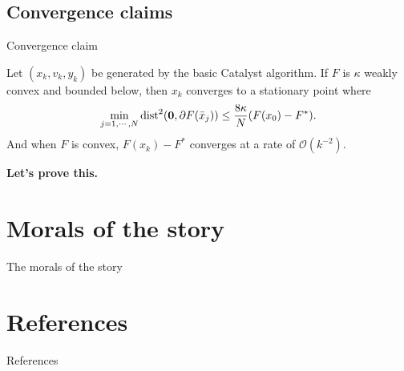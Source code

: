 \documentclass[11pt]{beamer}
\begin{document}
    \subsection{Convergence claims}
        \begin{frame}{Convergence claim}
            \begin{theorem}
                Let $(x_k, v_k, y_k)$ be generated by the basic Catalyst algorithm. 
                If $F$ is $\kappa$ weakly convex and bounded below, then $x_k$ converges to a stationary point where
                \begin{align*}
                    \min_{j = 1, \cdots, N} \operatorname{dist}^2(\mathbf 0, \partial F(\bar x_j))
                    \le \frac{8 \kappa}{N}(F(x_0) - F^*). 
                \end{align*}
                And when $F$ is convex, $F(x_k) - F^*$ converges at a rate of $\mathcal O(k^{-2})$. 
            \end{theorem}
            \pause
            \textbf{Let's prove this.} 
        \end{frame}

\section{Morals of the story}
    \begin{frame}{The morals of the story}
        
    \end{frame}
    
\section{References}
    \begin{frame}{References}
        \tiny
    \end{frame}
\end{document}

